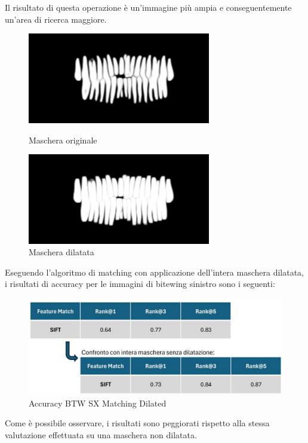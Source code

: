 \documentclass[12pt,a4paper,openright,twoside]{book}
\begin{document}
Il risultato di questa operazione è un'immagine più ampia e conseguentemente un'area di ricerca maggiore.
\begin{figure}[H]
    \centering
    \begin{minipage}{0.45\textwidth}
	\centering
    	\includegraphics[width=8cm]{figures/maskoriginal.pdf}
    	\caption{Maschera originale}
    	\label{lab:Maschera Originale}
    \end{minipage}\hfill
    \begin{minipage}{0.45\textwidth}
    	\centering
    	\includegraphics[width=8cm]{figures/maskdilated.pdf}
    	\caption{Maschera dilatata}
    	\label{lab:Maschera dilatata}
    \end{minipage}\hfill
\end{figure}

Eseguendo l'algoritmo di matching con applicazione dell'intera maschera dilatata, i risultati di accuracy per le immagini di bitewing sinistro sono i seguenti:
\begin{figure}[H]
	\centering
	\includegraphics{figures/sx6_1.pdf}
    	\caption{Accuracy BTW SX Matching Dilated}
	\label{fig:sx6}
\end{figure}
Come è possibile osservare, i risultati sono peggiorati rispetto alla stessa valutazione effettuata su una maschera non dilatata.\\
\end{document}
